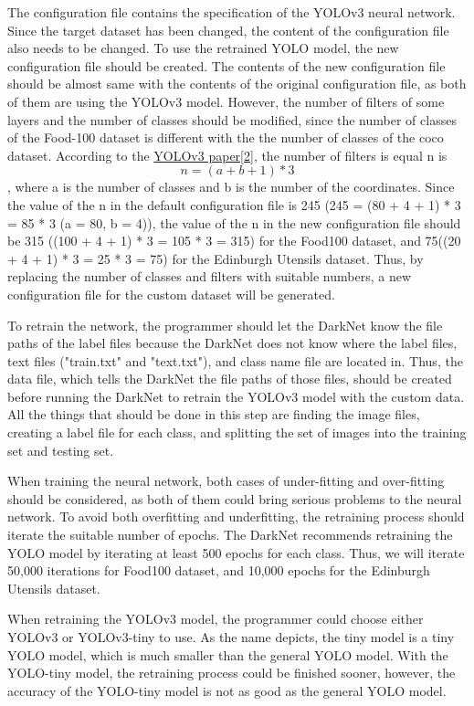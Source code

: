 \documentclass{article}
\begin{document}
The configuration file contains the specification of the YOLOv3 neural network. Since the target dataset has been changed, the content of the configuration file also needs to be changed. To use the retrained YOLO model, the new configuration file should be created. The contents of the new configuration file should be almost same with the contents of the original configuration file, as both of them are using the YOLOv3 model. However, the number of filters of some layers and the number of classes should be modified, since the number of classes of the Food-100 dataset is different with the the number of classes of the coco dataset. According to the \hyperlink{ref2}{YOLOv3 paper[2]}, the number of filters is equal n is $$n = (a + b + 1) * 3$$, where a is the number of classes and b is the number of the coordinates. Since the value of the n in the default configuration file is 245 (245 = (80 + 4 + 1) * 3 = 85 * 3  (a = 80, b = 4)), the value of the n in the new configuration file should be 315 ((100 + 4 + 1) * 3 = 105 * 3 = 315) for the Food100 dataset, and 75((20 + 4 + 1) * 3 = 25 * 3 = 75) for the Edinburgh Utensils dataset. Thus, by replacing the number of classes and filters with suitable numbers, a new configuration file for the custom dataset will be generated.

To retrain the network, the programmer should let the DarkNet know the file paths of the label files because the DarkNet does not know where the label files, text files ("train.txt" and "text.txt"), and class name file are located in. Thus, the data file, which tells the DarkNet the file paths of those files, should be created before running the DarkNet to retrain the YOLOv3 model with the custom data. All the things that should be done in this step are finding the image files, creating a label file for each class, and splitting the set of images into the training set and testing set.

When training the neural network, both cases of under-fitting and over-fitting should be considered, as both of them could bring serious problems to the neural network. To avoid both overfitting and underfitting, the retraining process should iterate the suitable number of epochs. The DarkNet recommends retraining the YOLO model by iterating at least 500 epochs for each class. Thus, we will iterate 50,000 iterations for Food100 dataset, and 10,000 epochs for the Edinburgh Utensils dataset.

When retraining the YOLOv3 model, the programmer could choose either YOLOv3 or YOLOv3-tiny to use. As the name depicts, the tiny model is a tiny YOLO model, which is much smaller than the general YOLO model. With the YOLO-tiny model, the retraining process could be finished sooner, however, the accuracy of the YOLO-tiny model is not as good as the general YOLO model.
\end{document}
